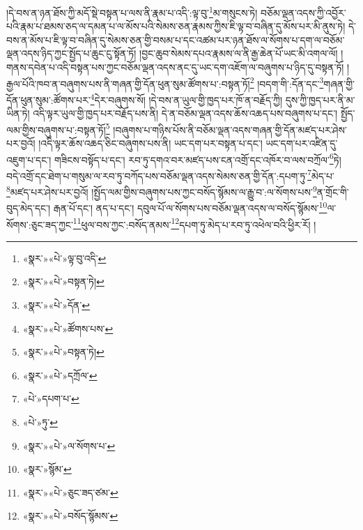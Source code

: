 །དེ་བས་ན་ཉན་ཐོས་ཀྱི་མདོ་སྡེ་བསྟན་པ་ལས་ནི་རྣམ་པ་འདི་:ལྟ་བུ་\footnote{«སྣར་»«པེ་»ལྟ་བུ་འདི་}མ་གསུངས་ཏེ། བཅོམ་ལྡན་འདས་ཀྱི་འབྱོར་པའི་རྣམ་པ་ཐམས་ཅད་ལ་དམན་པ་ལ་མོས་པའི་སེམས་ཅན་རྣམས་ཀྱིས་ཇི་ལྟ་བ་བཞིན་དུ་མོས་པར་མི་ནུས་ཏེ། དེ་བས་ན་མོས་པ་ཇི་ལྟ་བ་བཞིན་དུ་སེམས་ཅན་གྱི་བསམ་པ་དང་འཚམ་པར་ཉན་ཐོས་ལ་སོགས་པ་དག་ལ་བཅོམ་ལྡན་འདས་ཉིད་ཀྱང་སྤྱོད་པ་ཆུང་ངུ་སྟོན་ཏོ། །བྱང་ཆུབ་སེམས་དཔའ་རྣམས་ལ་ནི་རྒྱ་ཆེན་པོ་ཡང་མི་འགལ་ལོ། །གནས་དབེན་པ་འདི་བསྟན་པས་ཀྱང་བཅོམ་ལྡན་འདས་ནང་དུ་ཡང་དག་འཇོག་ལ་བཞུགས་པ་ཉིད་དུ་བསྟན་ཏོ། །རྒྱལ་པོའི་ཁབ་ན་བཞུགས་པས་ནི་གཞན་གྱི་དོན་ཕུན་སུམ་ཚོགས་པ་:བསྟན་ཏོ།\footnote{«སྣར་»«པེ་»བསྟན་ཏེ།} །བདག་གི་:དོན་དང་\footnote{«སྣར་»«པེ་»དོན་}གཞན་གྱི་དོན་ཕུན་སུམ་:ཚོགས་པར་\footnote{«སྣར་»«པེ་»ཚོགས་པས་}དེར་བཞུགས་སོ། །དེ་བས་ན་ཡུལ་གྱི་ཁྱད་པར་ཁོ་ན་བརྗོད་ཀྱི། དུས་ཀྱི་ཁྱད་པར་ནི་མ་ཡིན་ཏེ། འདི་ལྟར་ཡུལ་གྱི་ཁྱད་པར་བརྗོད་པས་ནི། དེ་ན་བཅོམ་ལྡན་འདས་ཆོས་འཆད་པས་བཞུགས་པ་དང་། སྤྱོད་ལམ་གྱིས་བཞུགས་པ་:བསྟན་ཏོ།\footnote{«སྣར་»«པེ་»བསྟན་ཏེ།} །བཞུགས་པ་གཉིས་པོས་ནི་བཅོམ་ལྡན་འདས་གཞན་གྱི་དོན་མཛད་པར་ཤེས་པར་བྱའོ། །འདི་ལྟར་ཆོས་འཆད་ཅིང་བཞུགས་པས་ནི། ཡང་དག་པར་བསྟན་པ་དང་། ཡང་དག་པར་འཛིན་དུ་འཇུག་པ་དང་། གཟིངས་བསྟོད་པ་དང་། རབ་ཏུ་དགའ་བར་མཛད་པས་ངན་འགྲོ་དང་འཁོར་བ་ལས་བཀྲོལ་\footnote{«སྣར་»«པེ་»དཀྲོལ་}ཏེ། བདེ་འགྲོ་དང་ཐེག་པ་གསུམ་ལ་རབ་ཏུ་བཀོད་པས་བཅོམ་ལྡན་འདས་སེམས་ཅན་གྱི་དོན་:དཔག་ཏུ་\footnote{«པེ་»དཔག་པ་}མེད་པ་\footnote{«པེ་»ཏུ་}མཛད་པར་ཤེས་པར་བྱའོ། །སྤྱོད་ལམ་གྱིས་བཞུགས་པས་ཀྱང་བསོད་སྙོམས་ལ་རྒྱུ་བ་:ལ་སོགས་པས་\footnote{«སྣར་»«པེ་»ལ་སོགས་པ་}ན་གྲོང་གི་བུད་མེད་དང་། རྒན་པོ་དང་། ནད་པ་དང་། དབུལ་པོ་ལ་སོགས་པས་བཅོམ་ལྡན་འདས་ལ་བསོད་སྙོམས་\footnote{«སྣར་»སྙོམ་}ལ་སོགས་:ཅུང་ཟད་ཀྱང་\footnote{«སྣར་»«པེ་»ཅུང་ཟད་ཙམ་}ཕུལ་བས་ཀྱང་:བསོད་ནམས་\footnote{«སྣར་»«པེ་»བསོད་སྙོམས་}དཔག་ཏུ་མེད་པ་རབ་ཏུ་འཕེལ་བའི་ཕྱིར་རོ། །
